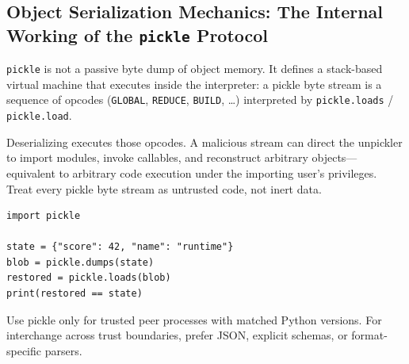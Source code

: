 \subsection{Object Serialization Mechanics: The Internal Working of the \texttt{pickle} Protocol}

\texttt{pickle} is not a passive byte dump of object memory. It defines a stack-based virtual machine that executes inside the interpreter: a pickle byte stream is a sequence of opcodes (\texttt{GLOBAL}, \texttt{REDUCE}, \texttt{BUILD}, \ldots) interpreted by \texttt{pickle.loads} / \texttt{pickle.load}.

Deserializing executes those opcodes. A malicious stream can direct the unpickler to import modules, invoke callables, and reconstruct arbitrary objects---equivalent to arbitrary code execution under the importing user's privileges. Treat every pickle byte stream as untrusted code, not inert data.

\begin{verbatim}
import pickle

state = {"score": 42, "name": "runtime"}
blob = pickle.dumps(state)
restored = pickle.loads(blob)
print(restored == state)
\end{verbatim}

Use pickle only for trusted peer processes with matched Python versions. For interchange across trust boundaries, prefer JSON, explicit schemas, or format-specific parsers.
